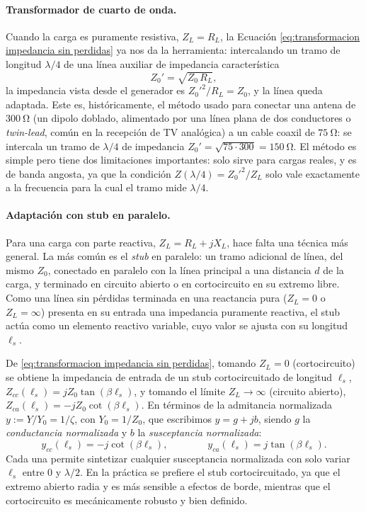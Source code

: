 \paragraph{Transformador de cuarto de onda.} Cuando la carga es puramente resistiva, $Z_L=R_L$, la Ecuación \eqref{eq:transformacion impedancia sin perdidas} ya nos da la herramienta: intercalando un tramo de longitud $\lambda/4$ de una línea auxiliar de impedancia característica
\begin{equation*}
    Z_0' = \sqrt{Z_0\, R_L},
\end{equation*}
la impedancia vista desde el generador es $Z_0'^2/R_L = Z_0$, y la línea queda adaptada. Este es, históricamente, el método usado para conectar una antena de $300\ \unit{\ohm}$ (un dipolo doblado, alimentado por una línea plana de dos conductores o \emph{twin-lead}, común en la recepción de TV analógica) a un cable coaxil de $75\ \unit{\ohm}$: se intercala un tramo de $\lambda/4$ de impedancia $Z_0'=\sqrt{75\cdot 300}=150\ \unit{\ohm}$. El método es simple pero tiene dos limitaciones importantes: solo sirve para cargas reales, y es de banda angosta, ya que la condición $Z(\lambda/4)=Z_0'^2/Z_L$ solo vale exactamente a la frecuencia para la cual el tramo mide $\lambda/4$.

\paragraph{Adaptación con stub en paralelo.} Para una carga con parte reactiva, $Z_L=R_L+jX_L$, hace falta una técnica más general. La más común es el \emph{stub} en paralelo: un tramo adicional de línea, del mismo $Z_0$, conectado en paralelo con la línea principal a una distancia $d$ de la carga, y terminado en circuito abierto o en cortocircuito en su extremo libre. Como una línea sin pérdidas terminada en una reactancia pura ($Z_L=0$ o $Z_L=\infty$) presenta en su entrada una impedancia puramente reactiva, el stub actúa como un elemento reactivo variable, cuyo valor se ajusta con su longitud $\ell_s$.

De \eqref{eq:transformacion impedancia sin perdidas}, tomando $Z_L=0$ (cortocircuito) se obtiene la impedancia de entrada de un stub cortocircuitado de longitud $\ell_s$, $Z_{cc}(\ell_s) = jZ_0\tan(\beta \ell_s)$, y tomando el límite $Z_L\to\infty$ (circuito abierto), $Z_{ca}(\ell_s) = -jZ_0\cot(\beta\ell_s)$. En términos de la admitancia normalizada $y:=Y/Y_0=1/\zeta$, con $Y_0=1/Z_0$, que escribimos $y=g+jb$, siendo $g$ la \emph{conductancia normalizada} y $b$ la \emph{susceptancia normalizada}:
\begin{equation}\label{eq:stub susceptancias}
    y_{cc}(\ell_s) = -j\cot(\beta \ell_s), \qquad\qquad y_{ca}(\ell_s) = j\tan(\beta \ell_s).
\end{equation}
Cada una permite sintetizar cualquier susceptancia normalizada con solo variar $\ell_s$ entre $0$ y $\lambda/2$. En la práctica se prefiere el stub cortocircuitado, ya que el extremo abierto radia y es más sensible a efectos de borde, mientras que el cortocircuito es mecánicamente robusto y bien definido.

